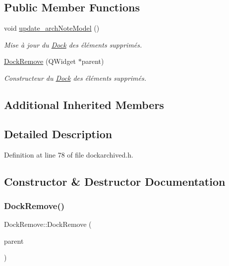 \subsection*{Public Member Functions}
\begin{DoxyCompactItemize}
\item 
\mbox{\label{class_dock_remove_a4e653c9a21161b7d76c9cfd330579047}} 
void \hyperlink{class_dock_remove_a4e653c9a21161b7d76c9cfd330579047}{update\+\_\+arch\+Note\+Model} ()
\begin{DoxyCompactList}\small\item\em Mise à jour du \hyperlink{class_dock}{Dock} des éléments supprimés. \end{DoxyCompactList}\item 
\hyperlink{class_dock_remove_aa2665bd1459600d9346029df9f2bba27}{Dock\+Remove} (Q\+Widget $\ast$parent)
\begin{DoxyCompactList}\small\item\em Constructeur du \hyperlink{class_dock}{Dock} des éléments supprimés. \end{DoxyCompactList}\end{DoxyCompactItemize}
\subsection*{Additional Inherited Members}


\subsection{Detailed Description}


Definition at line 78 of file dockarchived.\+h.



\subsection{Constructor \& Destructor Documentation}
\mbox{\label{class_dock_remove_aa2665bd1459600d9346029df9f2bba27}} 
\subsubsection{\texorpdfstring{Dock\+Remove()}{DockRemove()}}
{\footnotesize\ttfamily Dock\+Remove\+::\+Dock\+Remove (\begin{DoxyParamCaption}\item[{Q\+Widget $\ast$}]{parent }\end{DoxyParamCaption})}



